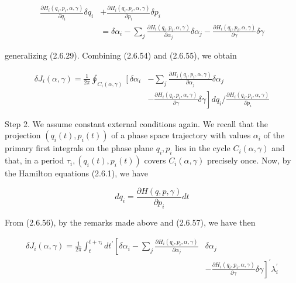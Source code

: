 \documentclass{article}
\begin{document}
\begin{align*}
\frac{\partial H_{i}\left(q_{i}, p_{i}, \alpha, \gamma\right)}{\partial q_{i}} \delta q_{i} & +\frac{\partial H_{i}\left(q_{i}, p_{i}, \alpha, \gamma\right)}{\partial p_{i}} \delta p_{i}  \tag{2.6.55}\\
& =\delta \alpha_{i}-\sum_{j} \frac{\partial H_{i}\left(q_{i}, p_{i}, \alpha, \gamma\right)}{\partial \alpha_{j}} \delta \alpha_{j}-\frac{\partial H_{i}\left(q_{i}, p_{i}, \alpha, \gamma\right)}{\partial \gamma} \delta \gamma
\end{align*}
 
generalizing (2.6.29). Combining (2.6.54) and (2.6.55), we obtain
 
\begin{align*}
\delta J_{i}(\alpha, \gamma)=\frac{1}{2 \pi} \oint_{C_{i}(\alpha, \gamma)}\left[\delta \alpha_{i}\right. & -\sum_{j} \frac{\partial H_{i}\left(q_{i}, p_{i}, \alpha, \gamma\right)}{\partial \alpha_{j}} \delta \alpha_{j}  \tag{2.6.56}\\
& \left.-\frac{\partial H_{i}\left(q_{i}, p_{i}, \alpha, \gamma\right)}{\partial \gamma} \delta \gamma\right] d q_{i} / \frac{\partial H_{i}\left(q_{i}, p_{i}, \alpha, \gamma\right)}{\partial p_{i}}
\end{align*}
 

Step 2. We assume constant external conditions again. We recall that the projection $\left(q_{i}(t), p_{i}(t)\right)$ of a phase space trajectory with values $\alpha_{i}$ of the primary first integrals on the phase plane $q_{i}, p_{i}$ lies in the cycle $C_{i}(\alpha, \gamma)$ and that, in a period $\tau_{i},\left(q_{i}(t), p_{i}(t)\right)$ covers $C_{i}(\alpha, \gamma)$ precisely once. Now, by the Hamilton equations (2.6.1), we have
 
\begin{equation*}
d q_{i}=\frac{\partial H(q, p, \gamma)}{\partial p_{i}} d t \tag{2.6.57}
\end{equation*}
 

From (2.6.56), by the remarks made above and (2.6.57), we have then
 
\begin{align*}
\delta J_{i}(\alpha, \gamma)=\frac{1}{2 \pi} \int_{t}^{t+\tau_{i}} d t^{\prime}\left[\delta \alpha_{i}-\sum_{j} \frac{\partial H_{i}\left(q_{i}, p_{i}, \alpha, \gamma\right)}{\partial \alpha_{j}}\right. & \delta \alpha_{j}  \tag{2.6.58}\\
& \left.-\frac{\partial H_{i}\left(q_{i}, p_{i}, \alpha, \gamma\right)}{\partial \gamma} \delta \gamma\right]^{\prime} \lambda_{i}^{\prime}
\end{align*}
 
\end{document}
